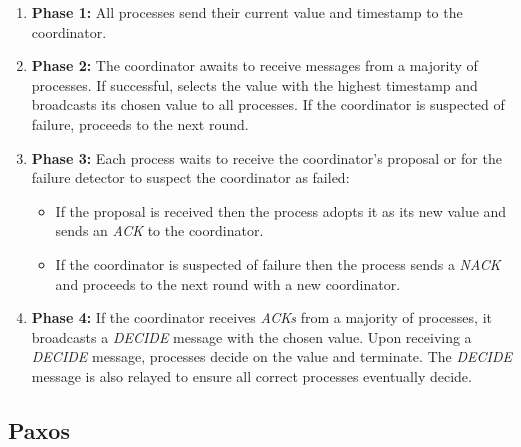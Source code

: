 \begin{enumerate}
  \item \textbf{Phase 1:} All processes send their current value and timestamp to the coordinator.
  \item \textbf{Phase 2:} The coordinator awaits to receive messages from a majority of processes.
  If successful, selects the value with the highest timestamp and broadcasts its chosen
  value to all processes. If the coordinator is suspected of failure, proceeds to the next round.
  \item \textbf{Phase 3:} Each process waits to receive the coordinator's proposal or for
  the failure detector to suspect the coordinator as failed:
  \begin{itemize}
    \item If the proposal is received then the process adopts it as its new value and sends
    an \textit{ACK} to the coordinator.
    \item If the coordinator is suspected of failure then the process sends a \textit{NACK} and proceeds
    to the next round with a new coordinator.
  \end{itemize}
  \item \textbf{Phase 4:} If the coordinator receives \textit{ACKs} from a majority of processes,
  it broadcasts a \textit{DECIDE} message with the chosen value. Upon receiving a \textit{DECIDE}
  message, processes decide on the value and terminate. The \textit{DECIDE} message is also
  relayed to ensure all correct processes eventually decide.
\end{enumerate}

\subsection{Paxos}\label{sub:paxos}


